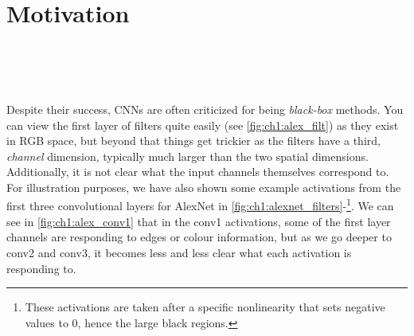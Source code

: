 \section{Motivation}\label{sec:ch1:motivation}
\begin{figure}
  \centering
  \\
  \\
  \\
  \label{fig:ch1:alexnet_filters}
\end{figure}
Despite their success, CNNs are often criticized for being \emph{black-box}
methods. You can view the first layer of filters
quite easily (see \autoref{fig:ch1:alex_filt}) as they exist in RGB
space, but beyond that things get trickier as the filters have a third, \emph{channel}
dimension, typically much larger than the two spatial dimensions. Additionally,
it is not clear what the input channels themselves correspond to. For illustration
purposes, we have also shown some example activations from the first three
convolutional layers for AlexNet in
\autoref{fig:ch1:alexnet_filters}-\footnote{These activations are
taken after a specific nonlinearity that sets negative values to 0, hence the
large black regions.}. We can see in \autoref{fig:ch1:alex_conv1} that
in the conv1 activations, some of the first layer channels are responding to
edges or colour information, but as we go deeper to conv2 and conv3, it becomes
less and less clear what each activation is responding to.

